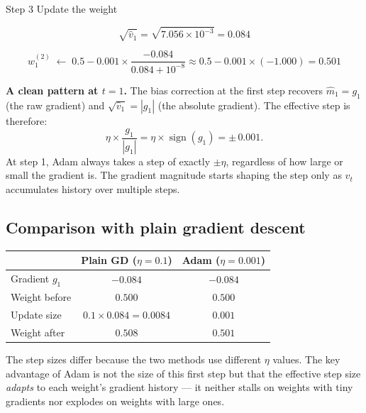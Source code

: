 \documentclass[12pt, a4paper]{article}
\newif\ifstudentmode
\newcommand{\sol}[2][6cm]{%
  \ifstudentmode
    \underline{\hspace{#1}}%
  \else
    {#2}%
  \fi
}
\theoremstyle{definition}
\begin{document}
\vspace{0.8em}

\begin{stepbox}{Step 3 \quad Update the weight}

\[
  \sqrt{\hat{v}_1} = \sqrt{7.056 \times 10^{-3}}
                   = \sol[3cm]{0.084}
\]

\[
  w^{(2)}_1 \;\longleftarrow\;
  0.5 - 0.001 \times \frac{-0.084}{0.084 + 10^{-8}}
  \approx 0.5 - 0.001 \times (-1.000)
  = \sol[3cm]{0.501}
\]
\end{stepbox}

\vspace{0.5em}

\begin{notebox}
\textbf{A clean pattern at $t = 1$.}
The bias correction at the first step recovers $\hat{m}_1 = g_1$ (the raw
gradient) and $\sqrt{\hat{v}_1} = |g_1|$ (the absolute gradient).  The
effective step is therefore:
\[
  \eta \times \frac{g_1}{|g_1|} = \eta \times \operatorname{sign}(g_1)
  = \pm\, 0.001.
\]
At step 1, Adam always takes a step of exactly $\pm\eta$, regardless of how
large or small the gradient is.  The gradient magnitude starts shaping the
step only as $v_t$ accumulates history over multiple steps.
\end{notebox}

\subsection*{Comparison with plain gradient descent}

\begin{center}
\renewcommand{\arraystretch}{1.4}
\begin{tabular}{lcc}
\toprule
 & Plain GD ($\eta = 0.1$) & Adam ($\eta = 0.001$) \\
\midrule
Gradient $g_1$ & $-0.084$ & $-0.084$ \\
Weight before  & $0.500$  & $0.500$ \\
Update size    & $0.1 \times 0.084 = 0.0084$ & $0.001$ \\
Weight after   & $0.508$  & $0.501$ \\
\bottomrule
\end{tabular}
\end{center}

The step sizes differ because the two methods use different $\eta$ values.
The key advantage of Adam is not the size of this first step but that the
effective step size \emph{adapts} to each weight's gradient history ---
it neither stalls on weights with tiny gradients nor explodes on weights
with large ones.
\end{document}

